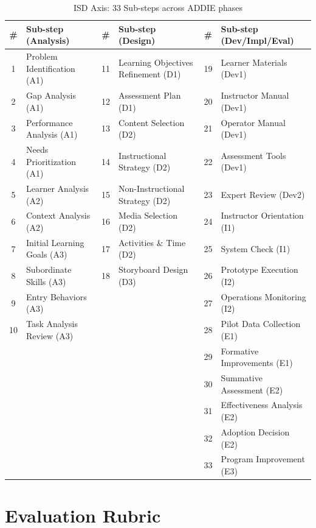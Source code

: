 \begin{table}[t]
\centering
\small
\caption{ISD Axis: 33 Sub-steps across ADDIE phases}
\label{tab:isd-axis}
\begin{tabular}{cl|cl|cl}
\toprule
\textbf{\#} & \textbf{Sub-step (Analysis)} & \textbf{\#} & \textbf{Sub-step (Design)} & \textbf{\#} & \textbf{Sub-step (Dev/Impl/Eval)} \\
\midrule
1 & Problem Identification (A1) & 11 & Learning Objectives Refinement (D1) & 19 & Learner Materials (Dev1) \\
2 & Gap Analysis (A1) & 12 & Assessment Plan (D1) & 20 & Instructor Manual (Dev1) \\
3 & Performance Analysis (A1) & 13 & Content Selection (D2) & 21 & Operator Manual (Dev1) \\
4 & Needs Prioritization (A1) & 14 & Instructional Strategy (D2) & 22 & Assessment Tools (Dev1) \\
5 & Learner Analysis (A2) & 15 & Non-Instructional Strategy (D2) & 23 & Expert Review (Dev2) \\
6 & Context Analysis (A2) & 16 & Media Selection (D2) & 24 & Instructor Orientation (I1) \\
7 & Initial Learning Goals (A3) & 17 & Activities \& Time (D2) & 25 & System Check (I1) \\
8 & Subordinate Skills (A3) & 18 & Storyboard Design (D3) & 26 & Prototype Execution (I2) \\
9 & Entry Behaviors (A3) & & & 27 & Operations Monitoring (I2) \\
10 & Task Analysis Review (A3) & & & 28 & Pilot Data Collection (E1) \\
& & & & 29 & Formative Improvements (E1) \\
& & & & 30 & Summative Assessment (E2) \\
& & & & 31 & Effectiveness Analysis (E2) \\
& & & & 32 & Adoption Decision (E2) \\
& & & & 33 & Program Improvement (E3) \\
\bottomrule
\end{tabular}
\end{table}

\section{Evaluation Rubric}
\label{app:rubric}


